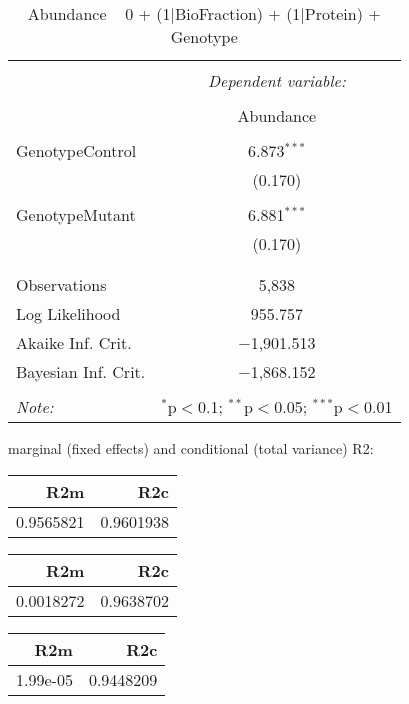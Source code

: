 \documentclass[11pt]{report}
\begin{document}
\begin{table}[!htbp] \centering 
  \caption{Abundance ~ 0 + (1|BioFraction) + (1|Protein) + Genotype} 
  \label{} 
\begin{tabular}{@{\extracolsep{5pt}}lc} 
\\[-1.8ex]\hline 
\hline \\[-1.8ex] 
 & \multicolumn{1}{c}{\textit{Dependent variable:}} \\ 
\cline{2-2} 
\\[-1.8ex] & Abundance \\ 
\hline \\[-1.8ex] 
 GenotypeControl & 6.873$^{***}$ \\ 
  & (0.170) \\ 
  & \\ 
 GenotypeMutant & 6.881$^{***}$ \\ 
  & (0.170) \\ 
  & \\ 
\hline \\[-1.8ex] 
Observations & 5,838 \\ 
Log Likelihood & 955.757 \\ 
Akaike Inf. Crit. & $-$1,901.513 \\ 
Bayesian Inf. Crit. & $-$1,868.152 \\ 
\hline 
\hline \\[-1.8ex] 
\textit{Note:}  & \multicolumn{1}{r}{$^{*}$p$<$0.1; $^{**}$p$<$0.05; $^{***}$p$<$0.01} \\ 
\end{tabular} 
\end{table} 
marginal (fixed effects) and conditional (total variance) R2:

\begin{tabular}{r|r}
\hline
R2m & R2c\\
\hline
0.9565821 & 0.9601938\\
\hline
\end{tabular}

\begin{tabular}{r|r}
\hline
R2m & R2c\\
\hline
0.0018272 & 0.9638702\\
\hline
\end{tabular}

\begin{tabular}{r|r}
\hline
R2m & R2c\\
\hline
1.99e-05 & 0.9448209\\
\hline
\end{tabular}
\end{document}
